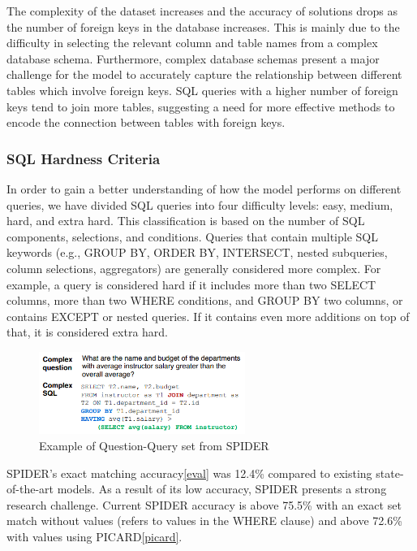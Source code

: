 The complexity of the dataset increases and the accuracy of solutions drops as the number of foreign keys in the database increases. This is mainly due to the difficulty in selecting the relevant column and table names from a complex database schema. Furthermore, complex database schemas present a major challenge for the model to accurately capture the relationship between different tables which involve foreign keys. SQL queries with a higher number of foreign keys tend to join more tables, suggesting a need for more effective methods to encode the connection between tables with foreign keys.

\subsubsection*{SQL Hardness Criteria}

In order to gain a better understanding of how the model performs on different queries, we have divided SQL queries into four difficulty levels: easy, medium, hard, and extra hard. This classification is based on the number of SQL components, selections, and conditions. Queries that contain multiple SQL keywords (e.g., GROUP BY, ORDER BY, INTERSECT, nested subqueries, column selections, aggregators) are generally considered more complex. For example, a query is considered hard if it includes more than two SELECT columns, more than two WHERE conditions, and GROUP BY two columns, or contains EXCEPT or nested queries. If it contains even more additions on top of that, it is considered extra hard.

\begin{figure}[htb]
    \centering
    \includegraphics[width=0.6\textwidth]{pics/db/Spider2.png}
    \caption{Example of Question-Query set from SPIDER\cite{yu_spider_2019}}
    \label{fig:Spider2}
\end{figure}


SPIDER's exact matching accuracy\ref{eval} was 12.4\% compared to existing state-of-the-art models. As a result of its low accuracy, SPIDER presents a strong research challenge. Current SPIDER accuracy is above 75.5\% with an exact set match without values (refers to values in the WHERE clause) and above 72.6\% with values using PICARD\ref{picard}.

